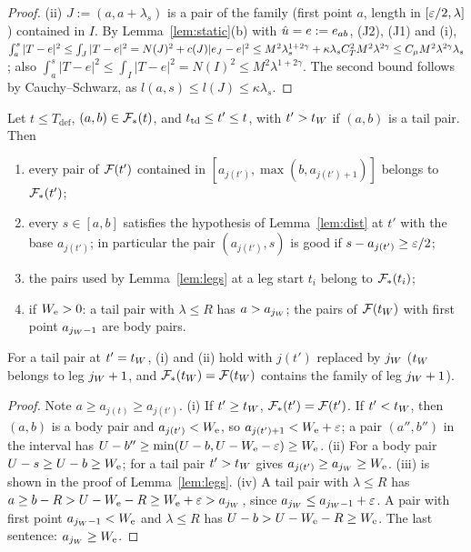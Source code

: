 \begin{proof}
(ii) $J:=(a,a+\lambda_s)$ is a pair of the family (first point $a$, length in $[\varepsilon/2,\lambda]$) contained in $I$. By
Lemma~\ref{lem:static}(b) with $\hat u=e:=e_{ab}$, (J2), (J1) and (i),
$\int_a^s|T-e|^2\le\int_J|T-e|^2=N(J)^2+c(J)|e_J-e|^2\le M^2\lambda_s^{1+2\gamma}+\kappa\lambda_sC_T^2M^2\lambda^{2\gamma}\le C_\mu M^2\lambda^{2\gamma}\lambda_s$;
also $\int_a^s|T-e|^2\le\int_I|T-e|^2=N(I)^2\le M^2\lambda^{1+2\gamma}$. The second bound follows by Cauchy--Schwarz, as
$l(a,s)\le l(J)\le\kappa\lambda_s$.
\end{proof}

\begin{lemma}[Locality]\label{lem:local}
Let $t\le T_{\mathrm{def}}$, $(a,b)\in\mathcal F_*(t)$, and $t_{\mathrm{td}}\le t'\le t$, with $t'>t_W$ if $(a,b)$ is a tail pair. Then
\begin{enumerate}
\item[(i)] every pair of $\mathcal F(t')$ contained in $[a_{j(t')},\max(b,a_{j(t')+1})]$ belongs to $\mathcal F_*(t')$;
\item[(ii)] every $s\in[a,b]$ satisfies the hypothesis of Lemma~\ref{lem:dist} at $t'$ with the base $a_{j(t')}$; in particular the
pair $(a_{j(t')},s)$ is good if $s-a_{j(t')}\ge\varepsilon/2$;
\item[(iii)] the pairs used by Lemma~\ref{lem:legs} at a leg start $t_i$ belong to $\mathcal F_*(t_i)$;
\item[(iv)] if $W_{\mathrm e}>0$: a tail pair with $\lambda\le R$ has $a>a_{j_W}$; the pairs of $\mathcal F(t_W)$ with first point $a_{j_W-1}$ are body
pairs.
\end{enumerate}
For a tail pair at $t'=t_W$, \textup{(i)} and \textup{(ii)} hold with $j(t')$ replaced by $j_W$ \textup($t_W$ belongs to leg
$j_W+1$, and $\mathcal F_*(t_W)=\mathcal F(t_W)$ contains the family of leg $j_W+1$\textup).
\end{lemma}

\begin{proof}
Note $a\ge a_{j(t)}\ge a_{j(t')}$. (i) If $t'\ge t_W$, $\mathcal F_*(t')=\mathcal F(t')$. If $t'<t_W$, then $(a,b)$ is a body pair and
$a_{j(t')}<W_{\mathrm e}$, so $a_{j(t')+1}<W_{\mathrm e}+\varepsilon$; a pair $(a'',b'')$ in the interval has $U-b''\ge\min(U-b,U-W_{\mathrm e}-\varepsilon)\ge W_{\mathrm e}$. (ii) For a
body pair $U-s\ge U-b\ge W_{\mathrm e}$; for a tail pair $t'>t_W$ gives $a_{j(t')}\ge a_{j_W}\ge W_{\mathrm e}$. (iii) is shown in the proof of
Lemma~\ref{lem:legs}. (iv) A tail pair with $\lambda\le R$ has $a\ge b-R>U-W_{\mathrm e}-R\ge W_{\mathrm e}+\varepsilon>a_{j_W}$, since $a_{j_W}\le a_{j_W-1}+\varepsilon$.
A pair with first point $a_{j_W-1}<W_{\mathrm e}$ and $\lambda\le R$ has $U-b>U-W_{\mathrm e}-R\ge W_{\mathrm e}$. The last sentence: $a_{j_W}\ge W_{\mathrm e}$.
\end{proof}

